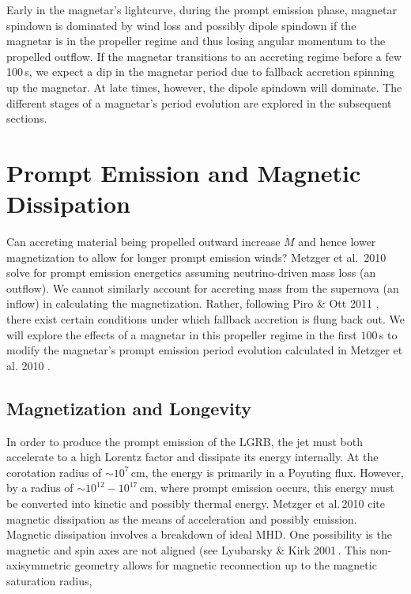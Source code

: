 \documentclass{article}
\begin{document}
Early in the magnetar's lightcurve, during the prompt emission phase, magnetar spindown is dominated by wind loss and possibly dipole spindown if the magnetar is in the propeller regime and thus losing angular momentum to the propelled outflow. If the magnetar transitions to an accreting regime before a few 100\,s, we expect a dip in the magnetar period due to fallback accretion spinning up the magnetar. At late times, however, the dipole spindown will dominate. The different stages of a magnetar's period evolution are explored in the subsequent sections.

\section{Prompt Emission and Magnetic Dissipation} \label{sec:prompt}
Can accreting material being propelled outward increase $\dot{M}$ and hence lower magnetization to allow for longer prompt emission winds?  Metzger et al.\ 2010 \cite{Metzger:2010pp} solve for prompt emission energetics assuming neutrino-driven mass loss (an outflow). We cannot similarly account for accreting mass from the supernova (an inflow) in calculating the magnetization. Rather, following Piro \& Ott 2011 \cite {Piro:2011ed}, there exist certain conditions under which fallback accretion is flung back out. We will explore the effects of a magnetar in this propeller regime in the first $100$\,s to modify the magnetar's prompt emission period evolution calculated in  Metzger et al. 2010 \cite{Metzger:2010pp}.

\subsection{Magnetization and Longevity} \label{sec:mag1}

In order to produce the prompt emission of the LGRB, the jet must both accelerate to a high Lorentz factor and dissipate its energy internally. At the corotation radius of $\sim 10^7$\,cm, the energy is primarily in a Poynting flux. However, by a radius of $\sim 10^{12}- 10^{17}$\,cm, where prompt emission occurs, this energy must be converted into kinetic and possibly thermal energy.  Metzger et al.\,2010 \cite{Metzger:2010pp} cite  magnetic dissipation as the means of acceleration and possibly emission. Magnetic dissipation involves a breakdown of ideal MHD. One possibility is the magnetic and spin axes are not aligned (see Lyubarsky \& Kirk 2001\,\cite{Lyubarsky:2000yn}. This non-axisymmetric geometry allows for magnetic reconnection up to the magnetic saturation radius,
\end{document}
